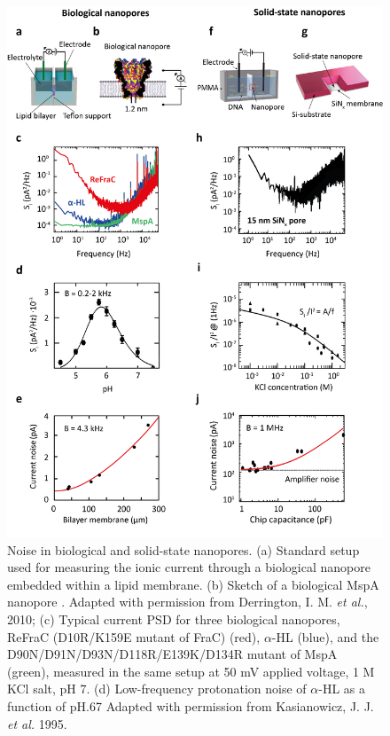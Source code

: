 \begin{figure}[H]
	\centering
	\includegraphics[width=0.8\linewidth]{figures/Figure3.3}
	\caption{Noise in biological and solid-state nanopores.
		(a) Standard setup used for measuring the ionic current through a biological nanopore embedded within a lipid membrane. (b) Sketch of a biological MspA nanopore \cite{Derrington2010}. Adapted with permission from Derrington, I. M. \emph{et al.}, 2010; 
		(c) Typical current PSD for three biological nanopores, ReFraC (D10R/K159E mutant of FraC)\cite{Wloka2016} (red), $\alpha$-HL (blue), and the D90N/D91N/D93N/D118R/E139K/D134R mutant of MspA (green), measured in the same setup at 50 mV applied voltage, 1 M KCl salt, pH 7. (d) Low-frequency protonation noise of $\alpha$-HL as a function of pH.67 Adapted with permission from Kasianowicz, J. J. \emph{et al.} 1995.
}
\end{figure}
